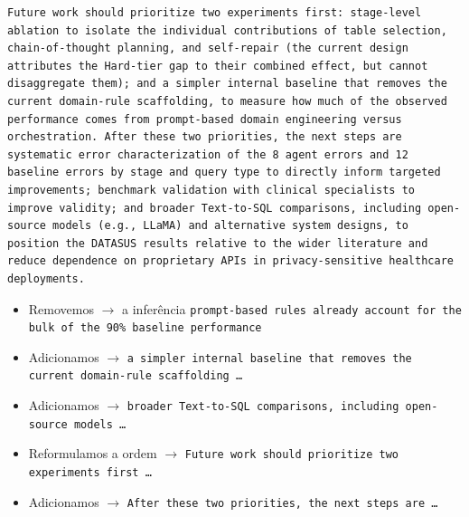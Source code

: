 \documentclass[11pt,a4paper]{article}
\begin{document}
\begin{finalblock}
\begin{lstlisting}[style=texsnippet]
Future work should prioritize two experiments first: stage-level ablation to isolate the individual contributions of table selection, chain-of-thought planning, and self-repair (the current design attributes the Hard-tier gap to their combined effect, but cannot disaggregate them); and a simpler internal baseline that removes the current domain-rule scaffolding, to measure how much of the observed performance comes from prompt-based domain engineering versus orchestration. After these two priorities, the next steps are systematic error characterization of the 8 agent errors and 12 baseline errors by stage and query type to directly inform targeted improvements; benchmark validation with clinical specialists to improve validity; and broader Text-to-SQL comparisons, including open-source models (e.g., LLaMA) and alternative system designs, to position the DATASUS results relative to the wider literature and reduce dependence on proprietary APIs in privacy-sensitive healthcare deployments.
\end{lstlisting}
\end{finalblock}

\begin{trackblock}
\begin{itemize}
  \item Removemos $\to$ a inferência \texttt{prompt-based rules already account for the bulk of the 90\% baseline performance}
  \item Adicionamos $\to$ \texttt{a simpler internal baseline that removes the current domain-rule scaffolding \ldots}
  \item Adicionamos $\to$ \texttt{broader Text-to-SQL comparisons, including open-source models \ldots}
  \item Reformulamos a ordem $\to$ \texttt{Future work should prioritize two experiments first \ldots}
  \item Adicionamos $\to$ \texttt{After these two priorities, the next steps are \ldots}
\end{itemize}
\end{trackblock}
\end{document}
